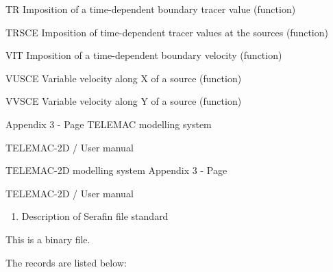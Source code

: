  TR Imposition of a time-dependent boundary tracer value (function)

 TRSCE Imposition of time-dependent tracer values at the sources (function)

 VIT Imposition of a time-dependent boundary velocity (function)

 VUSCE Variable velocity along X of a source (function)

 VVSCE Variable velocity along Y of a source (function)

 Appendix 3 - Page   TELEMAC modelling system

 TELEMAC-2D / User manual



 TELEMAC-2D modelling system Appendix 3 - Page

 TELEMAC-2D / User manual



\begin{enumerate}
\item   Description of Serafin file standard
\end{enumerate}



 This is a binary file.

 The records are listed below:


